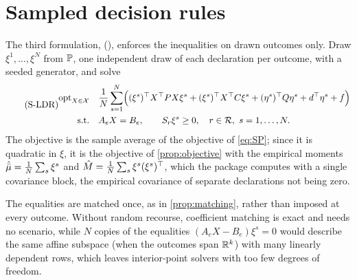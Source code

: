 \section{Sampled decision rules}
\label{sec:sampled}

The third formulation,  (), enforces the inequalities on drawn outcomes only.
Draw $\xi^1, \dots, \xi^N$ from $\mathbb{P}$, one independent draw of each declaration per outcome, with a seeded generator,
and solve
\begin{equation}
\label{eq:SLDR}
\tag{S-LDR}
\begin{aligned}
\operatorname{opt}_{X \in \mathcal{X}} \quad & \frac1N \sum_{s=1}^N \Bigl( (\xi^s)^\top X^\top P X \xi^s + (\xi^s)^\top X^\top C \xi^s + (\eta^s)^\top Q\eta^s + d^\top\eta^s + f \Bigr) \\
\text{s.t.} \quad & A_e X = B_e, \qquad S_r \xi^s \ge 0, \quad r \in \mathcal{R},\ s = 1, \dots, N.
\end{aligned}
\end{equation}
The objective is the sample average of the objective of \eqref{eq:SP};
since it is quadratic in $\xi$, it is the objective of \cref{prop:objective} with the empirical moments
$\hat{\bar\mu} = \frac1N\sum_s\xi^s$ and $\hat{M} = \frac1N\sum_s \xi^s(\xi^s)^\top$,
which the package computes with a single covariance block, the empirical covariance of separate declarations not being zero.

The equalities are matched once, as in \cref{prop:matching}, rather than imposed at every outcome.
Without random recourse, coefficient matching is exact and needs no scenario,
while $N$ copies of the equalities $(A_eX - B_e)\xi^s = 0$ would describe the same affine subspace (when the outcomes span $\mathbb{R}^k$) with many linearly dependent rows,
which leaves interior-point solvers with too few degrees of freedom.

